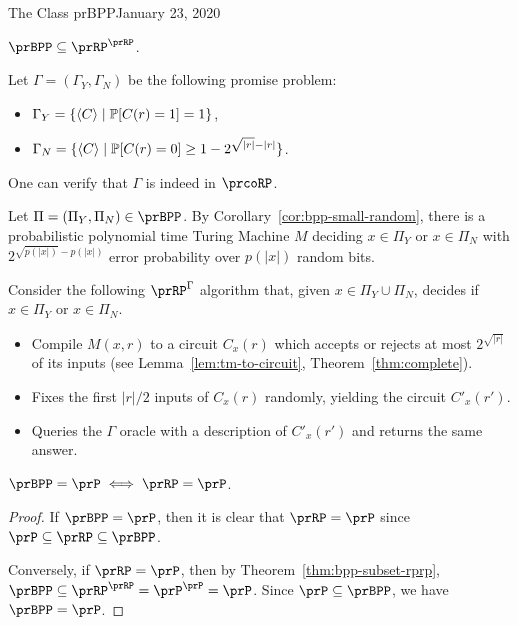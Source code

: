 \begin{lecture}{1}{The Class prBPP}{January 23, 2020}
\begin{theorem}\label{thm:bpp-subset-rprp}
    $\prBPP \subseteq \prRP^\prRP$.
\end{theorem}

\begin{proofsk}
    Let $\Gamma = (\Gamma_Y, \Gamma_N)$ be the following promise problem:
    \begin{itemize}
        \item $\Gamma_Y = \{\langle C \rangle \mid \mathbb{P}[C(r) = 1] = 1\}$,
        \item $\Gamma_N = \{\langle C \rangle \mid \mathbb{P}[C(r) = 0] \geq 1 - 2^{\sqrt{|r|} - |r|}\}$.
    \end{itemize}
    One can verify that $\Gamma$ is indeed in $\prcoRP$.

    Let $\Pi = (\Pi_Y, \Pi_N) \in \prBPP$.
    By Corollary~\ref{cor:bpp-small-random}, there is a probabilistic polynomial time 
    Turing Machine $M$ deciding $x \in \Pi_Y$ or $x \in \Pi_N$ with $2^{\sqrt{p(|x|)} 
    - p(|x|)}$ error probability over $p(|x|)$ random bits.
    
    Consider the following $\prRP^\Gamma$ algorithm that, given $x \in \Pi_Y \cup \Pi_N$, 
    decides if $x \in \Pi_Y$ or $x \in \Pi_N$.
    \begin{itemize}
        \item Compile $M(x,r)$ to a circuit $C_x(r)$ which accepts or rejects at most 
            $2^{\sqrt{|r|}}$ of its inputs (see Lemma~\ref{lem:tm-to-circuit}, 
            Theorem~\ref{thm:complete}).
        \item Fixes the first $|r|/2$ inputs of $C_x(r)$ randomly, yielding the circuit 
            $C'_x(r')$.
        \item Queries the $\Gamma$ oracle with a description of $C'_x(r')$ and returns 
            the same answer.
    \end{itemize}

\end{proofsk}

\begin{corollary}
    $\prBPP = \prP \iff \prRP = \prP$.
\end{corollary}

\begin{proof}
    If $\prBPP = \prP$, then it is clear that $\prRP = \prP$ since $\prP \subseteq
    \prRP \subseteq \prBPP$.

    Conversely, if $\prRP = \prP$, then by Theorem~\ref{thm:bpp-subset-rprp},
    $\prBPP \subseteq \prRP^\prRP = \prP^\prP = \prP$.
    Since $\prP \subseteq \prBPP$, we have $\prBPP = \prP$.
\end{proof}

\end{lecture}
